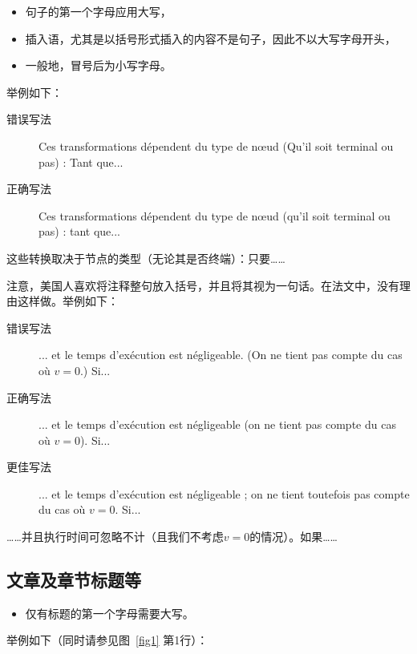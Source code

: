 \begin{itemize}
    \item 句子的第一个字母应用大写，
    \item 插入语，尤其是以括号形式插入的内容不是句子，因此不以大写字母开头，
    \item 一般地，冒号后为小写字母。
\end{itemize}

举例如下：

\begin{description}
    \item[错误写法]  Ces transformations dépendent du type de nœud (Qu'il soit terminal ou pas) : Tant que...
    \item[正确写法] Ces transformations dépendent du type de nœud (qu'il soit terminal ou pas) : tant que...
\end{description}

\begin{bil}
    这些转换取决于节点的类型（无论其是否终端）：只要……
\end{bil}

注意，美国人喜欢将注释整句放入括号，并且将其视为一句话。在法文中，没有理由这样做。举例如下：

\begin{description}
    \item[错误写法] ... et le temps d'exécution est négligeable. (On ne tient pas compte du cas où $v = 0$.) Si...
    \item[正确写法]  ... et le temps d'exécution est négligeable (on ne tient pas compte du cas où $v = 0$). Si...
    \item[更佳写法] ... et le temps d'exécution est négligeable ; on ne tient toutefois pas compte du cas où $v = 0$. Si...
\end{description}

\begin{bil}
    ……并且执行时间可忽略不计（且我们不考虑$v = 0$的情况）。如果……
\end{bil}

\subsection{文章及章节标题等}

\begin{itemize}
    \item 仅有标题的第一个字母需要大写。
\end{itemize}

举例如下（同时请参见图~\ref{fig1} 第1行）：

